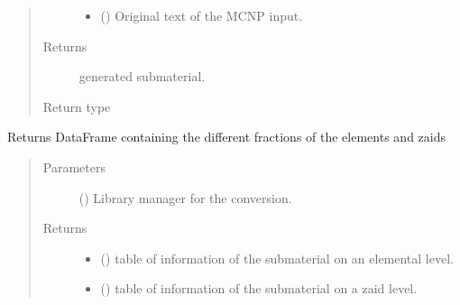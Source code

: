 \documentclass[letterpaper,10pt,english]{sphinxmanual}
\begin{document}
\begin{fulllineitems}
\begin{fulllineitems}
\begin{quote}
\begin{description}
\begin{itemize}
\item {} 
\sphinxAtStartPar
{} (\sphinxstyleliteralemphasis{\sphinxupquote{{[}}}\sphinxstyleliteralemphasis{\sphinxupquote{{]}}}) \textendash{} Original text of the MCNP input.

\end{itemize}

\item[{Returns}] \leavevmode
\sphinxAtStartPar
generated submaterial.

\item[{Return type}] \leavevmode
\sphinxAtStartPar
{\hyperref[\detokenize{api/inputgeneration:matreader.SubMaterial}]{}}

\end{description}\end{quote}

\end{fulllineitems}


\begin{fulllineitems}
\label{\detokenize{api/inputgeneration:matreader.SubMaterial.get_info}}
\sphinxAtStartPar
Returns DataFrame containing the different fractions of the elements
and zaids
\begin{quote}\begin{description}
\item[{Parameters}] \leavevmode
\sphinxAtStartPar
{} ({\hyperref[\detokenize{api/initobjects:libmanager.LibManager}]{}}) \textendash{} Library manager for the conversion.

\item[{Returns}] \leavevmode
\sphinxAtStartPar
\begin{itemize}
\item {} 
\sphinxAtStartPar
{} () \textendash{} table of information of the submaterial on an elemental level.

\item {} 
\sphinxAtStartPar
{} () \textendash{} table of information of the submaterial on a zaid level.


\end{itemize}
\end{description}
\end{quote}
\end{fulllineitems}
\end{fulllineitems}
\end{document}

